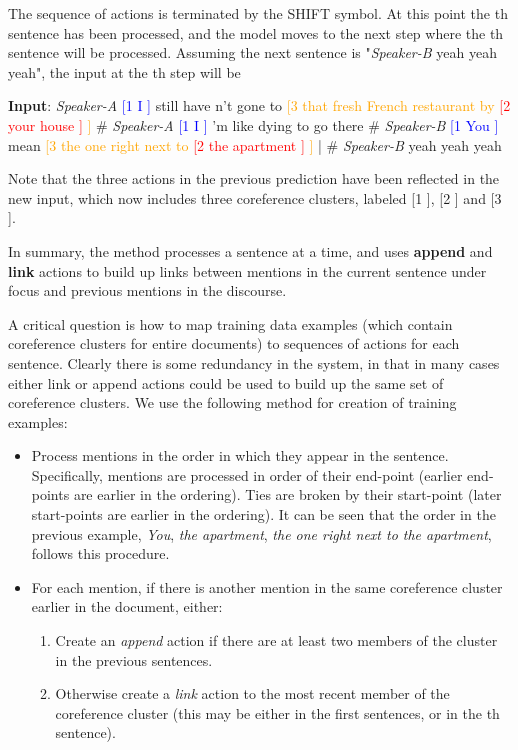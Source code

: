 \documentclass[11pt,a4paper]{article}
\begin{document}
The sequence of actions is terminated by the {\sc SHIFT} symbol. At this point the th sentence has been processed, and the model moves to the next step where the th sentence will be processed. Assuming the next sentence is "{\it Speaker-B} yeah yeah yeah", the input at the th step will be

\vspace{2ex}
\noindent
{\bf Input}:
{\it Speaker-A} \textcolor{blue}{[1 I ]} still have n't gone to \textcolor{orange}{[3 that fresh French restaurant by \textcolor{red}{ [2 your house ]} ]} \# {\it Speaker-A} \textcolor{blue}{[1 I ]} 'm like dying to go there \# {\it Speaker-B} \textcolor{blue}{[1 You ]} mean \textcolor{orange}{[3 the one right next to \textcolor{red}{[2 the apartment ]} ] } | \# {\it Speaker-B} yeah yeah yeah

\vspace{2ex}
\noindent
Note that the three actions in the previous prediction have been reflected in the new input, which now includes three coreference clusters, labeled [1 ], [2 ] and [3 ].

In summary, the method processes a sentence at a time, and uses {\bf append} and {\bf link} actions to build up links between mentions in the current sentence under focus and previous mentions in the discourse.

A critical question is how to map training data examples (which contain coreference clusters for entire documents) to sequences of actions for each sentence. Clearly there is some redundancy in the system, in that in many cases either link or append actions could be used to build up the same set of coreference clusters. We use the following method for creation of training examples:

\begin{itemize}
    \item Process mentions in the order in which they appear in the sentence. Specifically, mentions are processed in order of their end-point (earlier end-points are earlier in the ordering). Ties are broken by their start-point (later start-points are earlier in the ordering). It can be seen that the order in the previous example, {\em You}, {\em the apartment}, {\em the one right next to the apartment}, follows this procedure.
    
    \item For each mention, if there is another mention in the same coreference cluster earlier in the document, either:
    
    \begin{enumerate}
        \item Create an {\em append} action if there are at least two members of the cluster in the previous  sentences.
        \item Otherwise create a {\em link} action to the most recent member of the coreference cluster (this may be either in the first  sentences, or in the th sentence).
    \end{enumerate}
    
\end{itemize}
\end{document}
